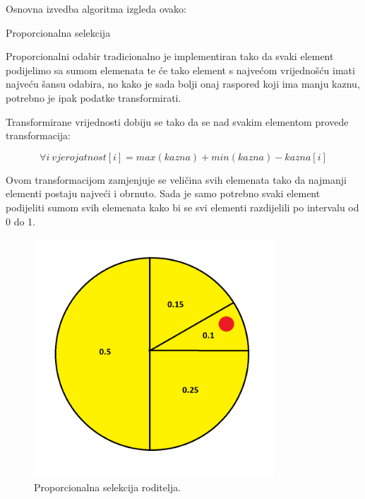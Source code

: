 \documentclass[times, utf8, zavrsni]{fer}
\begin{document}
Osnovna izvedba algoritma izgleda ovako:
\newpage
\begin{algorithm}
\caption{Proporcionalna selekcija}
\label{algo:proporcionalno}
\begin{algorithmic}
\STATE{}
\ENDFOR
{}
\ENDFOR
\STATE{}
\ENDIF
\ENDFOR
\end{algorithmic}
\end{algorithm}

Proporcionalni odabir tradicionalno je implementiran tako da svaki element podijelimo sa sumom elemenata te će tako element s najvećom vrijednošću imati najveću šansu odabira, no kako je sada bolji onaj raspored koji ima manju kaznu, potrebno je ipak podatke transformirati.

Transformirane vrijednosti dobiju se tako da se nad svakim elementom provede transformacija:

\begin{equation}
\forall i\ vjerojatnost[i] = max(kazna) + min(kazna) - kazna[i]
\label{eq:trans-kazne}
\end{equation}

Ovom transformacijom zamjenjuje se veličina svih elemenata tako da najmanji elementi postaju najveći i obrnuto. Sada je samo potrebno svaki element podijeliti sumom svih elemenata kako bi se svi elementi razdijelili po intervalu od 0 do 1.

\begin{figure}[htb]
\centering
\includegraphics[width=9cm]{images/rulet.png}
\caption{Proporcionalna selekcija roditelja.}
\label{fig:rulet}
\end{figure}
\end{document}
